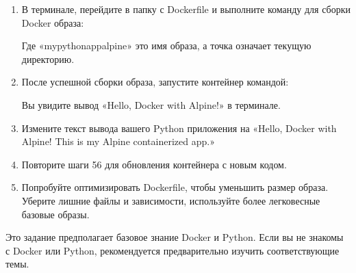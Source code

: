 \documentclass[letterpaper,10pt,russian]{sphinxmanual}
\begin{document}
\begin{enumerate}
\item {} 
\sphinxAtStartPar
{} В терминале, перейдите в папку с Dockerfile и выполните команду для сборки Docker образа:

\begin{sphinxVerbatim}[commandchars=\\\{\}]
    
\end{sphinxVerbatim}

\sphinxAtStartPar
Где «my\sphinxhyphen{}python\sphinxhyphen{}app\sphinxhyphen{}alpine» \sphinxhyphen{} это имя образа, а точка означает текущую директорию.

\item {} 
\sphinxAtStartPar
{} После успешной сборки образа, запустите контейнер командой:

\begin{sphinxVerbatim}[commandchars=\\\{\}]
  
\end{sphinxVerbatim}

\sphinxAtStartPar
Вы увидите вывод «Hello, Docker with Alpine!» в терминале.

\item {} 
\sphinxAtStartPar
{} Измените текст вывода вашего Python приложения на «Hello, Docker with Alpine! This is my Alpine containerized app.»

\item {} 
\sphinxAtStartPar
{} Повторите шаги 5\sphinxhyphen{}6 для обновления контейнера с новым кодом.

\item {} 
\sphinxAtStartPar
{} Попробуйте оптимизировать Dockerfile, чтобы уменьшить размер образа. Уберите лишние файлы и зависимости, используйте более легковесные базовые образы.

\end{enumerate}

\sphinxAtStartPar
{} Это задание предполагает базовое знание Docker и Python. Если вы не знакомы с Docker или Python, рекомендуется предварительно изучить соответствующие темы.
\end{document}
